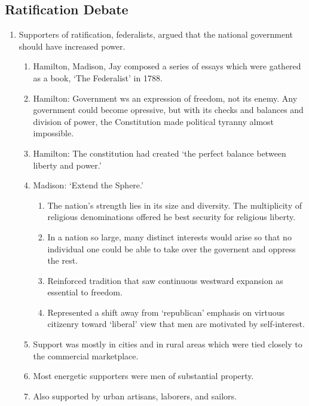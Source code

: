 \documentclass{article}
\begin{document}
    \subsection{Ratification Debate}
      \begin{enumerate}
        \item Supporters of ratification, federalists, argued that the national government should have increased power.
          \begin{enumerate}
            \item Hamilton, Madison, Jay composed a series of essays which were gathered as a book, `The Federalist' in 1788.
            \item Hamilton: Government ws an expression of freedom, not its enemy. Any government could become opressive, but with its checks and balances and division of power, the Constitution made political tyranny almost impossible.
            \item Hamilton: The constitution had created `the perfect balance between liberty and power.'
            \item Madison: `Extend the Sphere.'
              \begin{enumerate}
                \item The nation's strength lies in its size and diversity. The multiplicity of religious denominations offered he best security for religious liberty.
                \item In a nation so large, many distinct interests would arise so that no individual one could be able to take over the governent and oppress the rest.
                \item Reinforced tradition that saw continuous westward expansion as essential to freedom.
                \item Represented a shift away from `republican' emphasis on virtuous citizenry toward `liberal' view that men are motivated by self-interest.
              \end{enumerate}
            \item Support was mostly in cities and in rural areas which were tied closely to the commercial marketplace.
            \item Most energetic supporters were men of substantial property.
            \item Also supported by urban artisans, laborers, and sailors.
          \end{enumerate}


\end{enumerate}
\end{document}
